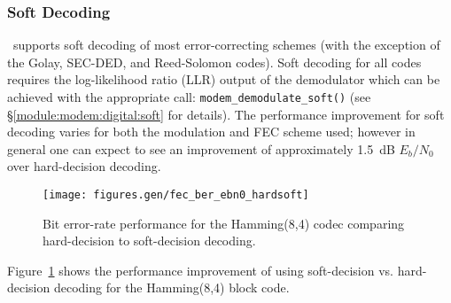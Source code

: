 \subsubsection{Soft Decoding}
\label{module:fec:soft}
\liquid\ supports soft decoding of most error-correcting schemes
(with the exception of the Golay, SEC-DED, and Reed-Solomon codes).
Soft decoding for all codes requires the log-likelihood ratio (LLR)
output of the demodulator which can be achieved with the appropriate
call: {\tt modem\_demodulate\_soft()}
(see \S\ref{module:modem:digital:soft} for details).
The performance improvement for soft decoding varies for both the
modulation and FEC scheme used;
however in general one can expect to see an improvement of approximately
1.5~dB $E_b/N_0$ over hard-decision decoding.
%
\begin{figure}[h]
\centering
  \texttt{[image: figures.gen/fec\_ber\_ebn0\_hardsoft]}
  \label{fig:fec:block_ber:esn0}
\caption{Bit error-rate performance for the Hamming(8,4) codec comparing
         hard-decision to soft-decision decoding.}
\label{fig:fec:hardsoft_ber}
\end{figure}
%
Figure~\ref{fig:fec:hardsoft_ber} shows the performance improvement of
using soft-decision vs. hard-decision decoding for the Hamming(8,4)
block code.

